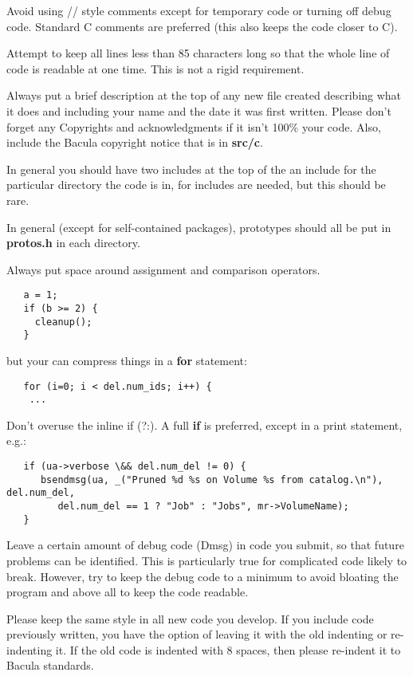 Avoid using // style comments except for temporary code or turning off debug
code. Standard C comments are preferred (this also keeps the code closer to
C). 

Attempt to keep all lines less than 85 characters long so that the whole line
of code is readable at one time. This is not a rigid requirement. 

Always put a brief description at the top of any new file created describing
what it does and including your name and the date it was first written. Please
don't forget any Copyrights and acknowledgments if it isn't 100\% your code.
Also, include the Bacula copyright notice that is in {\bf src/c}. 

In general you should have two includes at the top of the an include for the
particular directory the code is in, for includes are needed, but this should
be rare. 

In general (except for self-contained packages), prototypes should all be put
in {\bf protos.h} in each directory. 

Always put space around assignment and comparison operators. 

\footnotesize
\begin{verbatim}
   a = 1;
   if (b >= 2) {
     cleanup();
   }
\end{verbatim}
\normalsize

but your can compress things in a {\bf for} statement: 

\footnotesize
\begin{verbatim}
   for (i=0; i < del.num_ids; i++) {
    ...
\end{verbatim}
\normalsize

Don't overuse the inline if (?:). A full {\bf if} is preferred, except in a
print statement, e.g.: 

\footnotesize
\begin{verbatim}
   if (ua->verbose \&& del.num_del != 0) {
      bsendmsg(ua, _("Pruned %d %s on Volume %s from catalog.\n"), del.num_del,
         del.num_del == 1 ? "Job" : "Jobs", mr->VolumeName);
   }
\end{verbatim}
\normalsize

Leave a certain amount of debug code (Dmsg) in code you submit, so that future
problems can be identified. This is particularly true for complicated code
likely to break. However, try to keep the debug code to a minimum to avoid
bloating the program and above all to keep the code readable. 

Please keep the same style in all new code you develop. If you include code
previously written, you have the option of leaving it with the old indenting
or re-indenting it. If the old code is indented with 8 spaces, then please
re-indent it to Bacula standards. 

